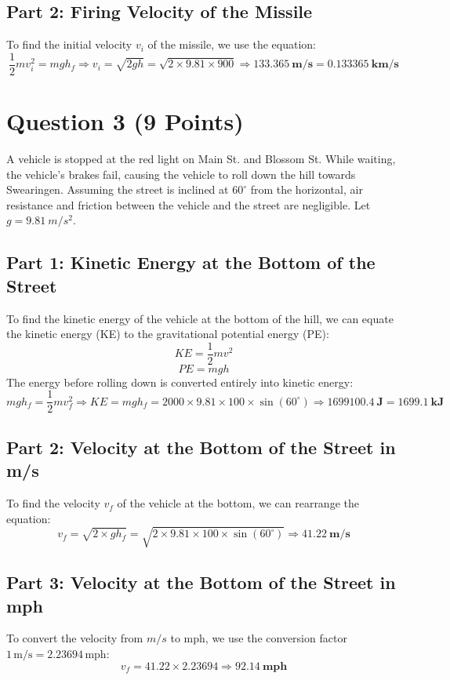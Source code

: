 \documentclass{article}
\begin{document}
\subsection*{Part 2: Firing Velocity of the Missile}
To find the initial velocity \( v_i \) of the missile, we use the equation:
\[
\frac{1}{2} m v_i^2 = mgh_f \Rightarrow v_i = \sqrt{2gh} = \sqrt{2 \times 9.81 \times 900} \Rightarrow \mathbf{\SI{133.365}{m/s} = \SI{0.133365}{km/s}}
\]

\newpage
\section*{Question 3 (9 Points)}

A vehicle is stopped at the red light on Main St. and Blossom St. While waiting, the vehicle's brakes fail, causing the vehicle to roll down the hill towards Swearingen. Assuming the street is inclined at \(60^\circ\) from the horizontal, air resistance and friction between the vehicle and the street are negligible. Let \( g = \SI{9.81}{m/s^2} \).

\subsection*{Part 1: Kinetic Energy at the Bottom of the Street}
To find the kinetic energy of the vehicle at the bottom of the hill, we can equate the kinetic energy (KE) to the gravitational potential energy (PE):
\[
KE = \frac{1}{2} mv^2
\]
\[
PE = mgh
\]
The energy before rolling down is converted entirely into kinetic energy:
\[
mgh_f = \frac{1}{2} mv_f^2 \Rightarrow KE = mgh_f = 2000 \times 9.81 \times 100 \times \sin(60^\circ) \Rightarrow \mathbf{\SI{1699100.4}{J} = \SI{1699.1}{kJ}}
\]

\subsection*{Part 2: Velocity at the Bottom of the Street in m/s}
To find the velocity \( v_f \) of the vehicle at the bottom, we can rearrange the equation:
\[
v_f = \sqrt{2 \times gh_f} = \sqrt{2 \times 9.81 \times 100 \times \sin(60^\circ)} \Rightarrow \mathbf{\SI{41.22}{m/s}}
\]

\subsection*{Part 3: Velocity at the Bottom of the Street in mph}
To convert the velocity from \( m/s \) to \( \text{mph} \), we use the conversion factor \( 1 \, \text{m/s} = 2.23694 \, \text{mph} \):
\[
v_f = 41.22 \times 2.23694 \Rightarrow \mathbf{\SI{92.14}{mph}}
\]
\end{document}
